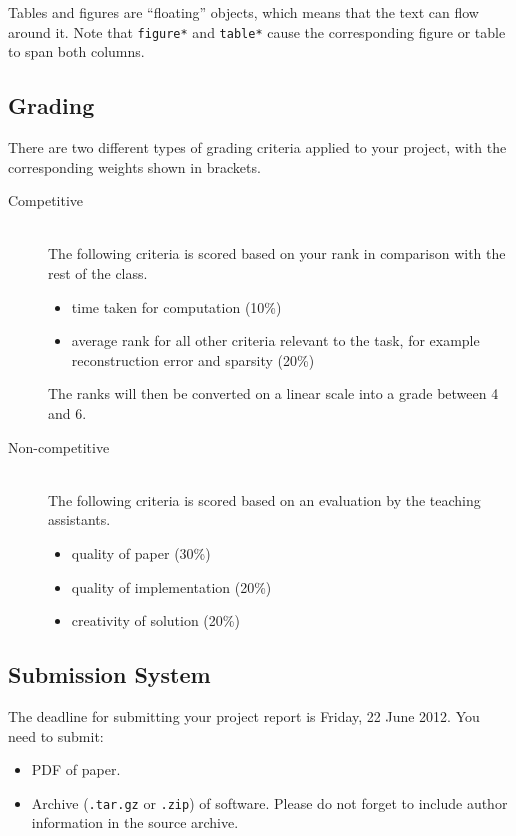 \documentclass[10pt,conference,compsocconf]{IEEEtran}
\begin{document}
Tables and figures are ``floating'' objects, which means that the text
can flow around it.
Note
that \texttt{figure*} and \texttt{table*} cause the corresponding
figure or table to span both columns.


\subsection{Grading}

There are two different types of grading criteria applied to your
project, with the corresponding weights shown in brackets.
\begin{description}
\item[Competitive] \ \\
  The following criteria is scored based on your rank
  in comparison with the rest of the class.
  \begin{itemize}
  \item time taken for computation (10\%)
  \item average rank for all other criteria relevant to the task, for
    example reconstruction error and sparsity (20\%)
  \end{itemize}
  The ranks will then be converted on a linear scale into a grade
  between 4 and 6.
\item[Non-competitive] \ \\
  The following criteria is scored based on an
  evaluation by the teaching assistants.
  \begin{itemize}
  \item quality of paper (30\%)
  \item quality of implementation (20\%)
  \item creativity of solution (20\%)
  \end{itemize}
\end{description}

\subsection{Submission System}

The deadline for submitting your project report is Friday, 22 June
2012.
You need to submit:
\begin{itemize}
\item PDF of paper.
\item Archive (\texttt{.tar.gz} or \texttt{.zip}) of software. Please
  do not forget to include author information in the source archive.
\end{itemize}
\end{document}
